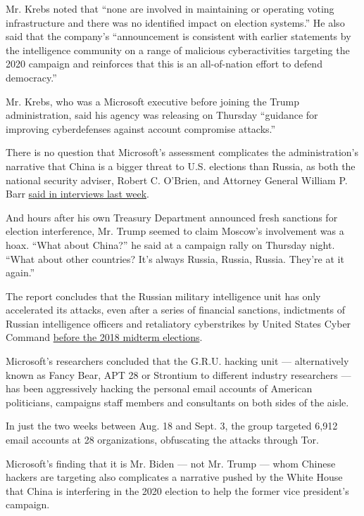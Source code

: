 Mr. Krebs noted that ``none are involved in maintaining or operating
voting infrastructure and there was no identified impact on election
systems.'' He also said that the company's ``announcement is consistent
with earlier statements by the intelligence community on a range of
malicious cyberactivities targeting the 2020 campaign and reinforces
that this is an all-of-nation effort to defend democracy.''

Mr. Krebs, who was a Microsoft executive before joining the Trump
administration, said his agency was releasing on Thursday ``guidance for
improving cyberdefenses against account compromise attacks.''

There is no question that Microsoft's assessment complicates the
administration's narrative that China is a bigger threat to U.S.
elections than Russia, as both the national security adviser, Robert C.
O'Brien, and Attorney General William P. Barr
\href{https://www.cnn.com/videos/politics/2020/09/02/china-russia-election-threat-attorney-general-bill-barr-blitzer-tsr-vpx.cnn}{said
in interviews last week}.

And hours after his own Treasury Department announced fresh sanctions
for election interference, Mr. Trump seemed to claim Moscow's
involvement was a hoax. ``What about China?'' he said at a campaign
rally on Thursday night. ``What about other countries? It's always
Russia, Russia, Russia. They're at it again.''

The report concludes that the Russian military intelligence unit has
only accelerated its attacks, even after a series of financial
sanctions, indictments of Russian intelligence officers and retaliatory
cyberstrikes by United States Cyber Command
\href{https://www.nytimes3xbfgragh.onion/2018/10/23/us/politics/russian-hacking-usa-cyber-command.html}{before
the 2018 midterm elections}.

Microsoft's researchers concluded that the G.R.U. hacking unit ---
alternatively known as Fancy Bear, APT 28 or Strontium to different
industry researchers --- has been aggressively hacking the personal
email accounts of American politicians, campaigns staff members and
consultants on both sides of the aisle.

In just the two weeks between Aug. 18 and Sept. 3, the group targeted
6,912 email accounts at 28 organizations, obfuscating the attacks
through Tor.

Microsoft's finding that it is Mr. Biden --- not Mr. Trump --- whom
Chinese hackers are targeting also complicates a narrative pushed by the
White House that China is interfering in the 2020 election to help the
former vice president's campaign.

